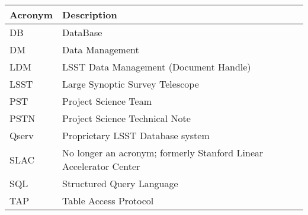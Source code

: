 \addtocounter{table}{-1}
\begin{longtable}{|l|p{}|}\hline
\textbf{Acronym} & \textbf{Description}  \\\hline

DB & DataBase \\\hline
DM & Data Management \\\hline
LDM & LSST Data Management (Document Handle) \\\hline
LSST & Large Synoptic Survey Telescope \\\hline
PST & Project Science Team \\\hline
PSTN & Project Science Technical Note \\\hline
Qserv & Proprietary LSST Database system \\\hline
SLAC & No longer an acronym; formerly Stanford Linear Accelerator Center \\\hline
SQL & Structured Query Language \\\hline
TAP & Table Access Protocol \\\hline
\end{longtable}
